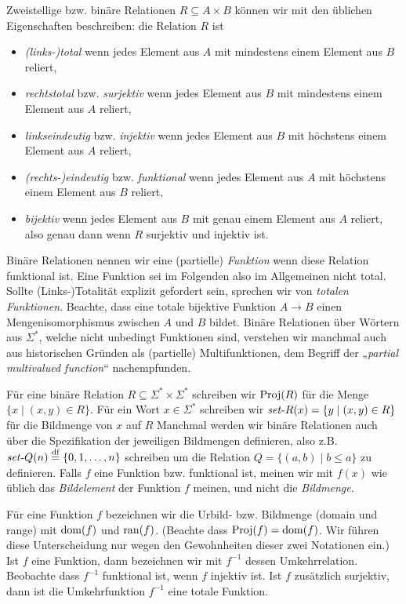 Zweistellige bzw. binäre Relationen $R\subseteq A\times B$ können wir mit den üblichen Eigenschaften beschreiben: die Relation $R$ ist
\begin{itemize}
    \item \emph{(links-)total} wenn jedes Element aus $A$ mit mindestens einem Element aus $B$ reliert,
    \item \emph{rechtstotal} bzw. \emph{surjektiv} wenn jedes Element aus $B$ mit mindestens einem Element aus $A$ reliert,
    \item \emph{linkseindeutig} bzw. \emph{injektiv} wenn jedes Element aus $B$ mit höchstens einem Element aus $A$ reliert,
    \item \emph{(rechts-)eindeutig} bzw. \emph{funktional} wenn jedes Element aus $A$ mit höchstens einem Element aus $B$ reliert,
    \item \emph{bijektiv} wenn jedes Element aus $B$ mit genau einem Element aus $A$ reliert, also genau dann wenn $R$ surjektiv und injektiv ist.
\end{itemize}
Binäre Relationen nennen wir eine (partielle) \emph{Funktion} wenn diese Relation funktional ist. Eine Funktion sei im Folgenden also im Allgemeinen nicht total. Sollte (Links-)Totalität explizit gefordert sein, sprechen wir von \emph{totalen Funktionen}.
Beachte, dass eine totale bijektive Funktion $A\to B$ einen Mengenisomorphismus zwischen $A$ und $B$ bildet.
Binäre Relationen über Wörtern aus $\Sigma^*$, welche nicht unbedingt Funktionen sind, verstehen wir manchmal auch aus historischen Gründen als (partielle) Multifunktionen, dem Begriff der „\emph{partial multivalued function}“ nachempfunden.

Für eine binäre Relation $R\subseteq\Sigma^* \times \Sigma^*$ schreiben wir $\operatorname{Proj}(R)$ für die Menge $\{ x\mid (x,y)\in R \}$. 
Für ein Wort $x\in\Sigma^*$ schreiben wir $\mathit{set}\text{-}{}R(x)=\{ y\mid (x,y)\in R \}$ für die Bildmenge von $x$ auf $R$
Manchmal werden wir binäre Relationen auch über die Spezifikation der jeweiligen Bildmengen definieren, also z.B. $\mathit{set}\text{-}{}Q(n) \stackrel{\text{df}}{=} \{ 0, 1, \dots, n\}$ schreiben um die Relation $Q=\{ (a,b)\mid b\leq a \}$ zu definieren.
Falls $f$ eine Funktion bzw. funktional ist, meinen wir mit $f(x)$ wie üblich das \emph{Bildelement} der Funktion $f$ meinen, und nicht die \emph{Bildmenge}. 



Für eine Funktion $f$ bezeichnen wir die Urbild- bzw. Bildmenge (domain und range) mit $\operatorname{dom}(f)$ und $\operatorname{ran}(f)$. (Beachte dass $\operatorname{Proj}(f)=\operatorname{dom}(f)$. Wir führen diese Unterscheidung nur wegen den Gewohnheiten dieser zwei Notationen ein.) Ist $f$ eine Funktion, dann bezeichnen wir mit $f^{-1}$ dessen Umkehrrelation. Beobachte dass $f^{-1}$ funktional ist, wenn $f$ injektiv ist. Ist $f$ zusätzlich surjektiv, dann ist die Umkehrfunktion $f^{-1}$ eine totale Funktion.

